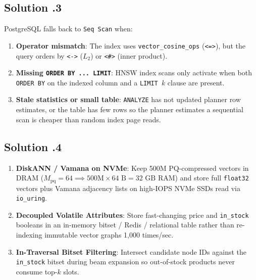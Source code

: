 \subsection*{Solution \thechapter.3}
PostgreSQL falls back to \texttt{Seq Scan} when:
\begin{enumerate}
  \item \textbf{Operator mismatch}: The index uses \texttt{vector\_cosine\_ops} (\texttt{<=>}), but the query orders by \texttt{<->} ($L_2$) or \texttt{<\#>} (inner product).
  \item \textbf{Missing \texttt{ORDER BY ... LIMIT}}: HNSW index scans only activate when both \texttt{ORDER BY} on the indexed column and a \texttt{LIMIT $k$} clause are present.
  \item \textbf{Stale statistics or small table}: \texttt{ANALYZE} has not updated planner row estimates, or the table has few rows so the planner estimates a sequential scan is cheaper than random index page reads.
\end{enumerate}

\subsection*{Solution \thechapter.4}
\begin{enumerate}
  \item \textbf{DiskANN / Vamana on NVMe}: Keep 500M PQ-compressed vectors in DRAM ($M_{\text{pq}} = 64 \implies 500\text{M} \times 64\text{ B} = 32\text{ GB}$ RAM) and store full \texttt{float32} vectors plus Vamana adjacency lists on high-IOPS NVMe SSDs read via \texttt{io\_uring}.
  \item \textbf{Decoupled Volatile Attributes}: Store fast-changing price and \texttt{in\_stock} booleans in an in-memory bitset / Redis / relational table rather than re-indexing immutable vector graphs 1,000 times/sec.
  \item \textbf{In-Traversal Bitset Filtering}: Intersect candidate node IDs against the \texttt{in\_stock} bitset during beam expansion so out-of-stock products never consume top-$k$ slots.
\end{enumerate}

